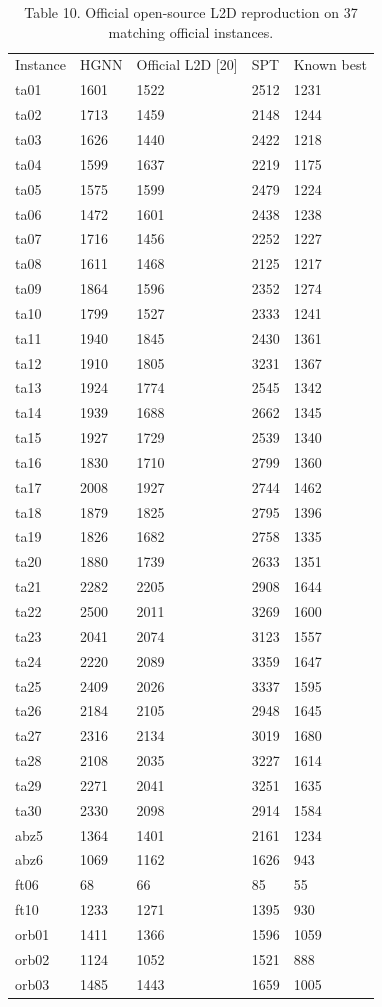 \documentclass{article}
\begin{document}
\begin{table}[h]
\centering
\begin{tabular}{lllll}
\toprule
Instance & HGNN & Official L2D {[}20{]} & SPT & Known best \\
ta01 & 1601 & 1522 & 2512 & 1231 \\
ta02 & 1713 & 1459 & 2148 & 1244 \\
ta03 & 1626 & 1440 & 2422 & 1218 \\
ta04 & 1599 & 1637 & 2219 & 1175 \\
ta05 & 1575 & 1599 & 2479 & 1224 \\
ta06 & 1472 & 1601 & 2438 & 1238 \\
ta07 & 1716 & 1456 & 2252 & 1227 \\
ta08 & 1611 & 1468 & 2125 & 1217 \\
ta09 & 1864 & 1596 & 2352 & 1274 \\
ta10 & 1799 & 1527 & 2333 & 1241 \\
ta11 & 1940 & 1845 & 2430 & 1361 \\
ta12 & 1910 & 1805 & 3231 & 1367 \\
ta13 & 1924 & 1774 & 2545 & 1342 \\
ta14 & 1939 & 1688 & 2662 & 1345 \\
ta15 & 1927 & 1729 & 2539 & 1340 \\
ta16 & 1830 & 1710 & 2799 & 1360 \\
ta17 & 2008 & 1927 & 2744 & 1462 \\
ta18 & 1879 & 1825 & 2795 & 1396 \\
ta19 & 1826 & 1682 & 2758 & 1335 \\
ta20 & 1880 & 1739 & 2633 & 1351 \\
ta21 & 2282 & 2205 & 2908 & 1644 \\
ta22 & 2500 & 2011 & 3269 & 1600 \\
ta23 & 2041 & 2074 & 3123 & 1557 \\
ta24 & 2220 & 2089 & 3359 & 1647 \\
ta25 & 2409 & 2026 & 3337 & 1595 \\
ta26 & 2184 & 2105 & 2948 & 1645 \\
ta27 & 2316 & 2134 & 3019 & 1680 \\
ta28 & 2108 & 2035 & 3227 & 1614 \\
ta29 & 2271 & 2041 & 3251 & 1635 \\
ta30 & 2330 & 2098 & 2914 & 1584 \\
abz5 & 1364 & 1401 & 2161 & 1234 \\
abz6 & 1069 & 1162 & 1626 & 943 \\
ft06 & 68 & 66 & 85 & 55 \\
ft10 & 1233 & 1271 & 1395 & 930 \\
orb01 & 1411 & 1366 & 1596 & 1059 \\
orb02 & 1124 & 1052 & 1521 & 888 \\
orb03 & 1485 & 1443 & 1659 & 1005 \\
\bottomrule
\end{tabular}
\caption{Table 10. Official open-source L2D reproduction on 37 matching official instances.}
\end{table}
\end{document}
